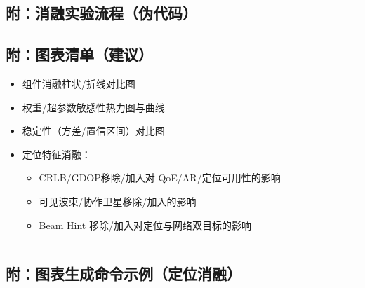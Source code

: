 \subsection{附：消融实验流程（伪代码）}\label{ux9644ux6d88ux878dux5b9eux9a8cux6d41ux7a0bux4f2aux4ee3ux7801}

\begin{Shaded}
\begin{Highlighting}[]
\OperatorTok{=}\NormalTok{ \{\}}
\OperatorTok{=}
\OperatorTok{=}
\OperatorTok{=}\OperatorTok{=}
\OperatorTok{=}
\end{Highlighting}
\end{Shaded}

\subsection{附：图表清单（建议）}\label{ux9644ux56feux8868ux6e05ux5355ux5efaux8bae-5}

\begin{itemize}
\tightlist
\item
  组件消融柱状/折线对比图
\item
  权重/超参数敏感性热力图与曲线
\item
  稳定性（方差/置信区间）对比图
\item
  定位特征消融：

  \begin{itemize}
  \tightlist
  \item
    CRLB/GDOP移除/加入对 QoE/AR/定位可用性的影响
  \item
    可见波束/协作卫星移除/加入的影响
  \item
    Beam Hint 移除/加入对定位与网络双目标的影响
  \end{itemize}
\end{itemize}

\begin{center}\rule{0.5\linewidth}{0.5pt}\end{center}

\subsection{附：图表生成命令示例（定位消融）}\label{ux9644ux56feux8868ux751fux6210ux547dux4ee4ux793aux4f8bux5b9aux4f4dux6d88ux878d}

